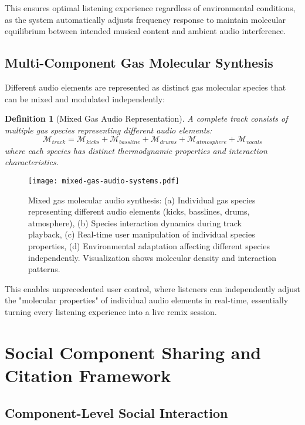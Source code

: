 \documentclass[12pt,a4paper]{article}
\newtheorem{definition}[theorem]{Definition}
\begin{document}
This ensures optimal listening experience regardless of environmental conditions, as the system automatically adjusts frequency response to maintain molecular equilibrium between intended musical content and ambient audio interference.

\subsection{Multi-Component Gas Molecular Synthesis}

Different audio elements are represented as distinct gas molecular species that can be mixed and modulated independently:

\begin{definition}[Mixed Gas Audio Representation]
A complete track consists of multiple gas species representing different audio elements:
\begin{equation}
\mathcal{M}_{track} = \mathcal{M}_{kicks} + \mathcal{M}_{bassline} + \mathcal{M}_{drums} + \mathcal{M}_{atmosphere} + \mathcal{M}_{vocals}
\end{equation}
where each species has distinct thermodynamic properties and interaction characteristics.
\end{definition}

\begin{figure}[h]
\centering
\texttt{[image: mixed-gas-audio-systems.pdf]}
\caption{Mixed gas molecular audio synthesis: (a) Individual gas species representing different audio elements (kicks, basslines, drums, atmosphere), (b) Species interaction dynamics during track playback, (c) Real-time user manipulation of individual species properties, (d) Environmental adaptation affecting different species independently. Visualization shows molecular density and interaction patterns.}
\label{fig:mixed-gas-audio-systems}
\end{figure}

This enables unprecedented user control, where listeners can independently adjust the "molecular properties" of individual audio elements in real-time, essentially turning every listening experience into a live remix session.

\section{Social Component Sharing and Citation Framework}

\subsection{Component-Level Social Interaction}
\end{document}

